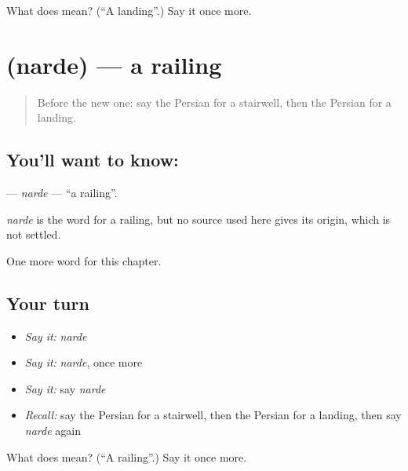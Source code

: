 \begin{tcolorbox}[breakable,colback=teal!4,colframe=teal!35!black,title={Before you move on}]
What does  mean? (\textquotedblleft{}A landing\textquotedblright{}.) Say it once more.
\end{tcolorbox}
\section[\texorpdfstring{\fa{نرده} (narde)}{نرده (narde)}]{ (narde) — a railing}

\label{lesson:FA-C232-narde}



\begin{quote}
Before the new one: say the Persian for a stairwell, then the Persian for a landing.
\end{quote}

\subsection*{You'll want to know: }
\textbf{} — \emph{narde} — \textquotedblleft{}a railing\textquotedblright{}.

\begin{cousinweb}
\emph{narde} is the word for a railing, but no source used here gives its origin, which is not settled.
\end{cousinweb}

\begin{grammarlens}[title={What you've built}]
One more word for this chapter.
\end{grammarlens}

\subsection*{Your turn}
\begin{itemize}
\raggedright
  \item \emph{Say it:} \emph{narde}
  \item \emph{Say it:} \emph{narde}, once more
  \item \emph{Say it:} say \emph{narde}
  \item \emph{Recall:} say the Persian for a stairwell, then the Persian for a landing, then say \emph{narde} again
\end{itemize}

\begin{tcolorbox}[breakable,colback=teal!4,colframe=teal!35!black,title={Before you move on}]
What does  mean? (\textquotedblleft{}A railing\textquotedblright{}.) Say it once more.
\end{tcolorbox}
